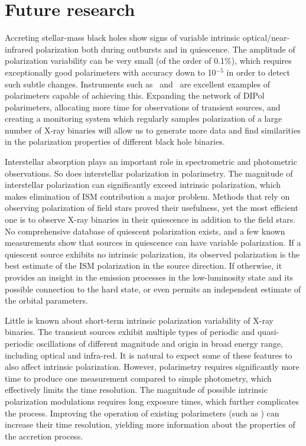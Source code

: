 \chapter{Future research}
Accreting stellar-mass black holes show signs of variable intrinsic optical/near-infrared polarization both during outbursts and in quiescence.
The amplitude of polarization variability can be very small (of the order of 0.1\%), which requires exceptionally good polarimeters with accuracy down to 10$^{-5}$ in order to detect such subtle changes.
Instruments such as \DP\ and \DUF\ are excellent examples of polarimeters capable of achieving this.
Expanding the network of DIPol polarimeters, allocating more time for observations of transient sources, and creating a monitoring system which regularly samples polarization of a large number of X-ray binaries will allow us to generate more data and find similarities in the polarization properties of different black hole binaries.

Interstellar absorption plays an important role in spectrometric and photometric observations.
So does interstellar polarization in polarimetry.
The magnitude of interstellar polarization can significantly exceed intrinsic polarization, which makes elimination of ISM contribution a major problem.
Methods that rely on observing polarization of field stars proved their usefulness, yet the most efficient one is to observe X-ray binaries in their quiescence in addition to the field stars.
No comprehensive database of quiescent polarization exists, and a few known measurements show that sources in quiescence can have variable polarization.
If a quiescent source exhibits no intrinsic polarization, its observed polarization is the best estimate of the \gls{ISM} polarization in the source direction.
If otherwise, it provides an insight in the emission processes in the low-luminosity state and its possible connection to the hard state, or even permits an independent estimate of the orbital parameters.

Little is known about short-term intrinsic polarization variability of X-ray binaries.
The transient sources exhibit multiple types of periodic and quasi-periodic oscillations of different magnitude and origin in broad energy range, including optical and infra-red.
It is natural to expect some of these features to also affect intrinsic polarization.
However, polarimetry requires significantly more time to produce one measurement compared to simple photometry, which effectively limits the time resolution.
The magnitude of possible intrinsic polarization modulations requires long exposure times, which further complicates the process.
Improving the operation of existing polarimeters (such as \DUF) can increase their time resolution, yielding more information about the properties of the accretion process.


